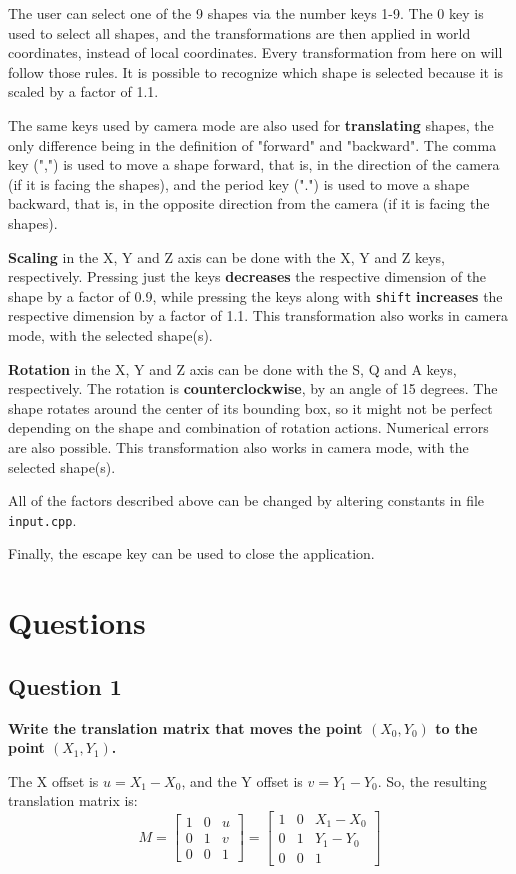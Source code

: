 \documentclass[12pt]{article}
\begin{document}
The user can select one of the 9 shapes via the number keys 1-9. The 0 key is used to select all shapes, and the transformations are then applied in world coordinates, instead of local coordinates. Every transformation from here on will follow those rules. It is possible to recognize which shape is selected because it is scaled by a factor of 1.1.

The same keys used by camera mode are also used for \textbf{translating} shapes, the only difference being in the definition of "forward" and "backward". The comma key (",") is used to move a shape forward, that is, in the direction of the camera (if it is facing the shapes), and the period key (".") is used to move a shape backward, that is, in the opposite direction from the camera (if it is facing the shapes).

\textbf{Scaling} in the X, Y and Z axis can be done with the X, Y and Z keys, respectively. Pressing just the keys \textbf{decreases} the respective dimension of the shape by a factor of 0.9, while pressing the keys along with \texttt{shift} \textbf{increases} the respective dimension by a factor of 1.1. This transformation also works in camera mode, with the selected shape(s).

\textbf{Rotation} in the X, Y and Z axis can be done with the S, Q and A keys, respectively. The rotation is \textbf{counterclockwise}, by an angle of 15 degrees. The shape rotates around the center of its bounding box, so it might not be perfect depending on the shape and combination of rotation actions. Numerical errors are also possible. This transformation also works in camera mode, with the selected shape(s).

All of the factors described above can be changed by altering constants in file \texttt{input.cpp}.

Finally, the escape key can be used to close the application.

\section{Questions}

\subsection*{Question 1}
{\bfseries Write the translation matrix that moves the point $(X_0, Y_0)$ to the point $(X_1, Y_1)$.}

The X offset is $u=X_1 - X_0$, and the Y offset is $v=Y_1 - Y_0$. So, the resulting translation matrix is:
\begin{equation*}
    M = 
    \begin{bmatrix}
    1 & 0 & u \\
    0 & 1 & v \\
    0 & 0 & 1
    \end{bmatrix}
    = 
    \begin{bmatrix}
    1 & 0 & X_1 - X_0 \\
    0 & 1 & Y_1 - Y_0 \\
    0 & 0 & 1
    \end{bmatrix}
\end{equation*}
\end{document}
